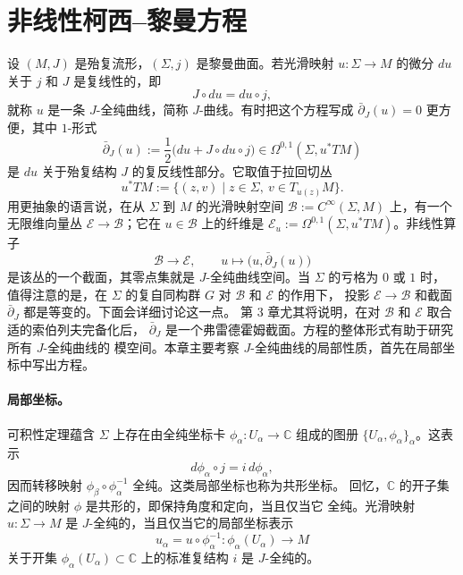 
\section{非线性柯西--黎曼方程}\label{sec:2-2}

设 $(M,J)$ 是殆复流形，$(\Sigma,j)$ 是黎曼曲面。若光滑映射 $u:\Sigma\to M$ 的微分
$du$ 关于 $j$ 和 $J$ 是复线性的，即
\[
  J\circ du=du\circ j,
\]
就称 $u$ 是一条 $J$-全纯曲线，简称 $J$-曲线。有时把这个方程写成
$\bar\partial_J(u)=0$ 更方便，其中 $1$-形式
\[
  \bar\partial_J(u):=\frac12\bigl(du+J\circ du\circ j\bigr)
  \in\Omega^{0,1}(\Sigma,u^*TM)
\]
是 $du$ 关于殆复结构 $J$ 的复反线性部分。它取值于拉回切丛
\[
  u^*TM:=\{(z,v)\mid z\in\Sigma,\ v\in T_{u(z)}M\}.
\]
用更抽象的语言说，在从 $\Sigma$ 到 $M$ 的光滑映射空间
$\mathcal B:=C^\infty(\Sigma,M)$ 上，有一个无限维向量丛
$\mathcal E\to\mathcal B$；它在 $u\in\mathcal B$ 上的纤维是
$\mathcal E_u:=\Omega^{0,1}(\Sigma,u^*TM)$。非线性算子
\[
  \mathcal B\longrightarrow\mathcal E,
  \qquad u\longmapsto\bigl(u,\bar\partial_J(u)\bigr)
\]
是该丛的一个截面，其零点集就是 $J$-全纯曲线空间。当 $\Sigma$ 的亏格为 $0$ 或 $1$ 时，
值得注意的是，在 $\Sigma$ 的复自同构群 $G$ 对 $\mathcal B$ 和 $\mathcal E$ 的作用下，
投影 $\mathcal E\to\mathcal B$ 和截面 $\bar\partial_J$ 都是等变的。下面会详细讨论这一点。
第 3 章尤其将说明，在对 $\mathcal B$ 和 $\mathcal E$ 取合适的索伯列夫完备化后，
$\bar\partial_J$ 是一个弗雷德霍姆截面。方程的整体形式有助于研究所有 $J$-全纯曲线的
模空间。本章主要考察 $J$-全纯曲线的局部性质，首先在局部坐标中写出方程。

\paragraph{局部坐标。}
可积性定理蕴含 $\Sigma$ 上存在由全纯坐标卡
$\phi_\alpha:U_\alpha\to\mathbb C$ 组成的图册
$\{U_\alpha,\phi_\alpha\}_\alpha$。这表示
\[
  d\phi_\alpha\circ j=i\,d\phi_\alpha,
\]
因而转移映射 $\phi_\beta\circ\phi_\alpha^{-1}$ 全纯。这类局部坐标也称为共形坐标。
回忆，$\mathbb C$ 的开子集之间的映射 $\phi$ 是共形的，即保持角度和定向，当且仅当它
全纯。光滑映射 $u:\Sigma\to M$ 是 $J$-全纯的，当且仅当它的局部坐标表示
\[
  u_\alpha=u\circ\phi_\alpha^{-1}:\phi_\alpha(U_\alpha)\to M
\]
关于开集 $\phi_\alpha(U_\alpha)\subset\mathbb C$ 上的标准复结构 $i$ 是 $J$-全纯的。

